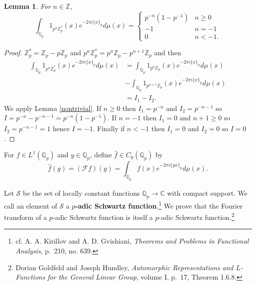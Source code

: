 \documentclass{article}
\newtheorem{lemma}[theorem]{Lemma}
\theoremstyle{definition}
\begin{document}
\begin{lemma}
For $n \in \mathbb{Z}$,
\[
\int_{\mathbb{Q}_p} 1_{p^n \mathbb{Z}_p^*}(x) e^{-2\pi i\{x\}_p} d\mu(x)
=\begin{cases}
p^{-n}(1-p^{-1})&n \geq 0\\
-1&n=-1\\
0&n<-1.
\end{cases}
\]
\end{lemma}
\begin{proof}
$\mathbb{Z}_p^* = \mathbb{Z}_p - p \mathbb{Z}_p$ and $p^n \mathbb{Z}_p^* = p^n \mathbb{Z}_p - p^{n+1} \mathbb{Z}_p$
and then
\begin{align*}
\int_{\mathbb{Q}_p} 1_{p^n \mathbb{Z}_p^*}(x) e^{-2\pi i\{x\}_p} d\mu(x)
&=\int_{\mathbb{Q}_p} 1_{p^n \mathbb{Z}_p}(x) e^{-2\pi i\{x\}_p} d\mu(x)\\
&-\int_{\mathbb{Q}_p} 1_{p^{n+1} \mathbb{Z}_p}(x) e^{-2\pi i\{x\}_p} d\mu(x)\\
&=I_1-I_2.
\end{align*}
We apply Lemma \ref{nontrivial}. If $n \geq 0$ then $I_1=p^{-n}$ and $I_2=p^{-n-1}$ so
$I=p^{-n}-p^{-n-1}= p^{-n}(1-p^{-1})$.
If $n=-1$ then $I_1=0$ and $n+1\geq 0$ so $I_2=p^{-n-1}=1$ hence
$I=-1$. Finally if $n<-1$ then $I_1=0$ and $I_2=0$ so $I=0$.
\end{proof}






For $f \in L^1(\mathbb{Q}_p)$ and $y \in \mathbb{Q}_p$, define $\widehat{f} \in C_0(\mathbb{Q}_p)$ by
\[
\widehat{f}(y) =(\mathscr{F}f)(y)= \int_{\mathbb{Q}_p} f(x) e^{-2\pi i\{yx\}_p} d\mu(x).
\]


Let $\mathscr{S}$ be the set of locally constant functions $\mathbb{Q}_p \to \mathbb{C}$ with compact support.
We call an element of $\mathscr{S}$ a \textbf{$p$-adic Schwartz function}.\footnote{cf. A. A. Kirillov and A. D. Gvishiani, 
{\em Theorems and Problems in Functional Analysis},
p.~210, no. 639.}
We prove that the Fourier transform of a $p$-adic Schwartz function is itself a $p$-adic Schwartz function.\footnote{Dorian Goldfeld and Joseph Hundley, {\em Automorphic Representations and $L$-Functions for the General Linear Group}, volume
I, p.~17, Theorem 1.6.8.}
\end{document}
